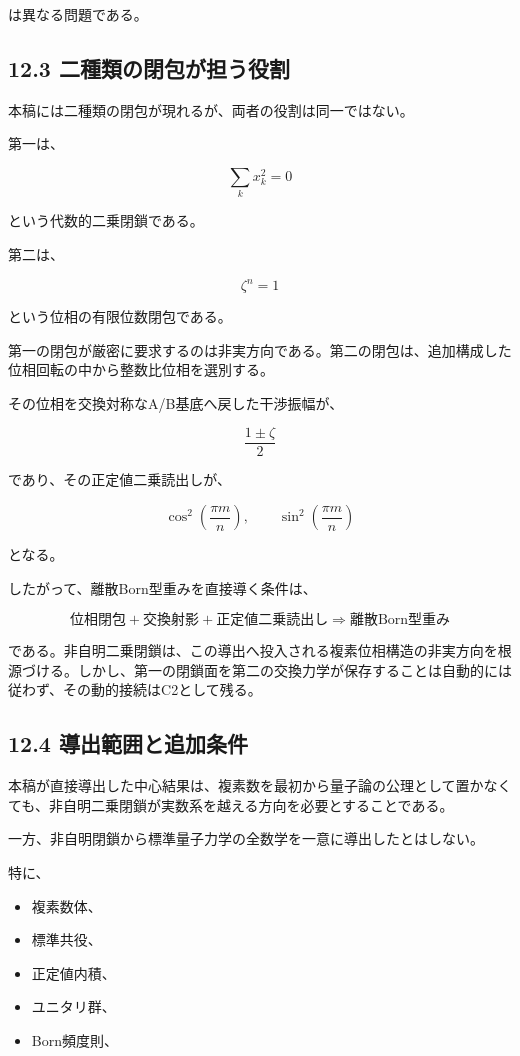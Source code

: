 \documentclass[
  a4paper,
  10pt]{article}
\providecommand{\tightlist}{%
  \setlength{\itemsep}{0pt}\setlength{\parskip}{0pt}}
\begin{document}
は異なる問題である。

\subsection{12.3
二種類の閉包が担う役割}\label{123-ux4e8cux7a2eux985eux306eux9589ux5305ux304cux62c5ux3046ux5f79ux5272}

本稿には二種類の閉包が現れるが、両者の役割は同一ではない。

第一は、

\[
\sum_kx_k^2=0
\]

という代数的二乗閉鎖である。

第二は、

\[
\zeta^n=1
\]

という位相の有限位数閉包である。

第一の閉包が厳密に要求するのは非実方向である。第二の閉包は、追加構成した位相回転の中から整数比位相を選別する。

その位相を交換対称なA/B基底へ戻した干渉振幅が、

\[
\frac{1\pm\zeta}{2}
\]

であり、その正定値二乗読出しが、

\[
\cos^2\left(\frac{\pi m}{n}\right),
\qquad
\sin^2\left(\frac{\pi m}{n}\right)
\]

となる。

したがって、離散Born型重みを直接導く条件は、

\[
\boxed{
\text{位相閉包}
+
\text{交換射影}
+
\text{正定値二乗読出し}
\Rightarrow
\text{離散Born型重み}
}
\]

である。非自明二乗閉鎖は、この導出へ投入される複素位相構造の非実方向を根源づける。しかし、第一の閉鎖面を第二の交換力学が保存することは自動的には従わず、その動的接続はC2として残る。

\subsection{12.4
導出範囲と追加条件}\label{124-ux5c0eux51faux7bc4ux56f2ux3068ux8ffdux52a0ux6761ux4ef6}

本稿が直接導出した中心結果は、複素数を最初から量子論の公理として置かなくても、非自明二乗閉鎖が実数系を越える方向を必要とすることである。

一方、非自明閉鎖から標準量子力学の全数学を一意に導出したとはしない。

特に、

\begin{itemize}
\tightlist
\item
  複素数体、
\item
  標準共役、
\item
  正定値内積、
\item
  ユニタリ群、
\item
  Born頻度則、
\end{itemize}
\end{document}

